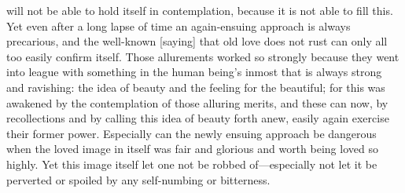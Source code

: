 \documentclass[12pt,a4paper]{book}
\begin{document}
will not be able to hold itself in contemplation, because it is not able to
fill this. Yet even after a long lapse of time an again-ensuing approach is
always precarious, and the well-known [saying] that old love does not rust
can only all too easily confirm itself. Those allurements worked so
strongly because they went into league with something in the human being's
inmost that is always strong and ravishing: the idea of beauty and the
feeling for the beautiful; for this was awakened by the contemplation of
those alluring merits, and these can now, by recollections and by calling
this idea of beauty forth anew, easily again exercise their former power.
Especially can the newly ensuing approach be dangerous when the loved image
in itself was fair and glorious and worth being loved so highly. Yet this
image itself let one not be robbed of---especially not let it be perverted
or spoiled by any self-numbing or bitterness.
\end{document}
